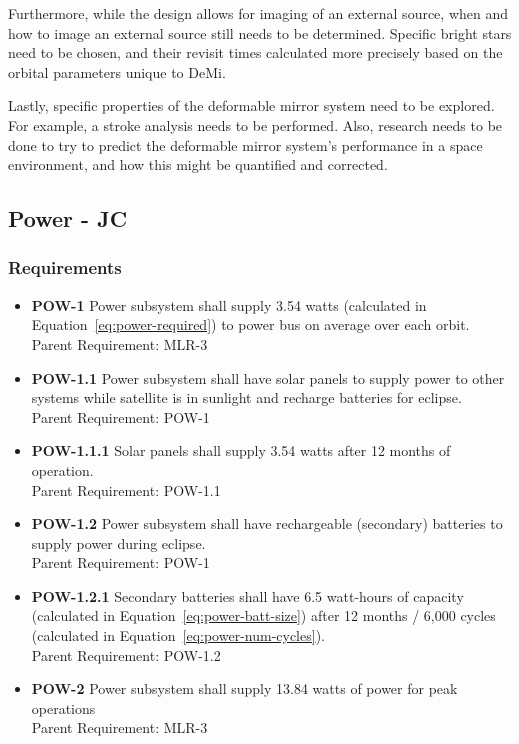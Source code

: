 \documentclass[12pt]{article}
\begin{document}
Furthermore, while the design allows for imaging of an external source, when and how to image an external
  source still needs to be determined. Specific bright stars need to be chosen, and their revisit times calculated more precisely based on the orbital parameters unique to DeMi.

Lastly, specific properties of the deformable mirror system need to be explored.  For example, a stroke analysis needs to be performed.  Also, research needs to be done to try to predict the deformable mirror system's performance in a space environment, and how this might be quantified and corrected.

\newpage
\FloatBarrier
			
		\subsection{Power - JC} \label{sec:power}
			\subsubsection{Requirements}
			
			\begin{itemize}
				\item \textbf{POW-1}  Power subsystem shall supply 3.54 watts (calculated in Equation~\ref{eq:power-required}) to power bus on average over each orbit.
				\\
				Parent Requirement: MLR-3
				\item \textbf{POW-1.1}  Power subsystem shall have solar panels to supply power to other systems while satellite is in sunlight and recharge batteries for eclipse.
				\\
				Parent Requirement: POW-1
				\item \textbf{POW-1.1.1}  Solar panels shall supply 3.54 watts after 12 months of operation.
				\\
				Parent Requirement: POW-1.1
				\item \textbf{POW-1.2}  Power subsystem shall have rechargeable (secondary) batteries to supply power during eclipse.
				\\
				Parent Requirement: POW-1
				\item \textbf{POW-1.2.1}  Secondary batteries shall have 6.5 watt-hours of capacity (calculated in Equation~\ref{eq:power-batt-size}) after 12 months / 6,000 cycles (calculated in Equation~\ref{eq:power-num-cycles}).
				\\
				Parent Requirement: POW-1.2
				\item \textbf{POW-2}  Power subsystem shall supply 13.84 watts of power for peak operations
				\\
				Parent Requirement: MLR-3
			\end{itemize}
			
\end{document}
